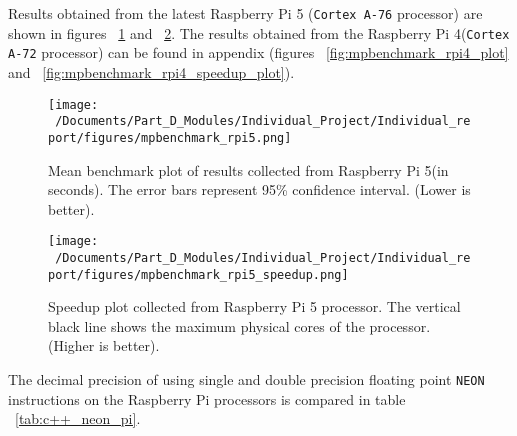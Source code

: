 Results obtained from the latest Raspberry Pi 5 (\texttt{Cortex A-76} processor) are shown in figures ~\ref{fig:mpbenchmark_rpi5_plot} and ~\ref{fig:mpbenchmark_rpi5_speedup_plot}. The results obtained from the Raspberry Pi 4(\texttt{Cortex A-72} processor) can be found in appendix (figures ~\ref{fig:mpbenchmark_rpi4_plot} and ~\ref{fig:mpbenchmark_rpi4_speedup_plot}).

\begin{figure}[htbp] %
	\centering
	\texttt{[image: ~/Documents/Part\_D\_Modules/Individual\_Project/Individual\_report/figures/mpbenchmark\_rpi5.png]} %
	\caption{Mean benchmark plot of results collected from Raspberry Pi 5(in seconds). The error bars represent 95\% confidence interval. (Lower is better).}
	\label{fig:mpbenchmark_rpi5_plot} %
\end{figure}

\begin{figure}[htbp] %
	\centering
	\texttt{[image: ~/Documents/Part\_D\_Modules/Individual\_Project/Individual\_report/figures/mpbenchmark\_rpi5\_speedup.png]} %
	\caption{Speedup plot collected from Raspberry Pi 5 processor. The vertical black line shows the maximum physical cores of the processor. (Higher is better).}
	\label{fig:mpbenchmark_rpi5_speedup_plot} %
\end{figure}

The decimal precision of using single and double precision floating point \texttt{NEON} instructions on the Raspberry Pi processors is compared in table ~\ref{tab:c++_neon_pi}.

